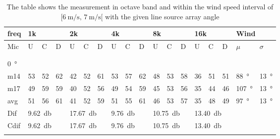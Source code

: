 \begin{table}[H]
\centering
\caption{The table shows the measurement in octave band and within the wind speed interval of $[\SI{6}{\meter\per\second},\, \SI{7}{\meter\per\second}[ $ with the given line source array angle}
\setlength\tabcolsep{5pt} %
\begin{tabular}{l|l|l|l|l|l|l|l|l|l|l|l|l|l|l|l|l|l}
freq & \multicolumn{3}{l|}{1k} & \multicolumn{3}{l|}{2k} & \multicolumn{3}{l|}{4k} & \multicolumn{3}{l|}{8k} & \multicolumn{3}{l|}{16k}   &  \multicolumn{2}{l}{Wind}                      \\ \hline
Mic  & U      & C      & D     & U      & C      & D     & U      & C      & D     & U      & C      & D     & U  & C  & D & $\mu$ & $\sigma$ \\ \hline
 & \multicolumn{3}{l|}{} & \multicolumn{3}{l|}{} & \multicolumn{3}{l|}{} & \multicolumn{3}{l|}{} & \multicolumn{3}{l|}{} &      \multicolumn{2}{l}{}                        \\ 
 \multicolumn{18}{l}{ } \\   
\SI{0}{\degree}   & \multicolumn{3}{l|}{} & \multicolumn{3}{l|}{} & \multicolumn{3}{l|}{} & \multicolumn{3}{l|}{} &  \multicolumn{3}{l|}{} &   \multicolumn{2}{l}{}   \\  \hline
m14  & 53     & 52     & 62    & 42     & 52     & 61    & 53     & 57     & 62    & 48     & 53     & 58    & 36 & 51 & 51 & \SI{88}{\degree} & \SI{13}{\degree}   \\
m17  & 49     & 59     & 59    & 40     & 52     & 56    & 49     & 54     & 59    & 45     & 53     & 56    & 35 & 44 & 46 &\SI{107}{\degree} & \SI{13}{\degree}  \\ \hline
avg  &   51    &   56   & 61    &  41    &  52    &  59  &   51     &  55   &   61  &  46    & 53    &  57     & 35   & 48   & 49 & \SI{97}{\degree} & \SI{13}{\degree} \\ \hline  
Dif & \multicolumn{3}{l|}{\SI{9.62}{\decibel}} & \multicolumn{3}{l|}{\SI{17.67}{\decibel}} & \multicolumn{3}{l|}{\SI{9.76}{\decibel}} & \multicolumn{3}{l|}{\SI{10.75}{\decibel}} &  \multicolumn{3}{l|}{\SI{13.40}{\decibel}} &  \multicolumn{2}{l}{}  \\ \hline 
Cdif & \multicolumn{3}{l|}{\SI{9.62}{\decibel}} & \multicolumn{3}{l|}{\SI{17.67}{\decibel}} & \multicolumn{3}{l|}{\SI{9.76}{\decibel}} & \multicolumn{3}{l|}{\SI{10.75}{\decibel}} & \multicolumn{3}{l|}{\SI{13.40}{\decibel}}  &   \multicolumn{2}{l}{}   \\ 
 \multicolumn{18}{l}{ } \\                             

\end{tabular}
\end{table}
